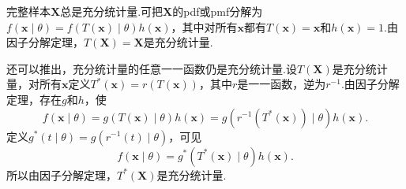 完整样本$\boldsymbol X$总是充分统计量.可把$\boldsymbol X$的pdf或pmf分解为$f(\boldsymbol x\mid\theta)=f(T(\boldsymbol x)\mid\theta)h(\boldsymbol x)$，其中对所有$\boldsymbol x$都有$T(\boldsymbol x)=\boldsymbol x$和$h(\boldsymbol x)=1$.由因子分解定理，$T(\boldsymbol X)=\boldsymbol X$是充分统计量.

还可以推出，充分统计量的任意一一函数仍是充分统计量.设$T(\boldsymbol X)$是充分统计量，对所有$\boldsymbol x$定义$T^*(\boldsymbol x)=r(T(\boldsymbol x))$，其中$r$是一一函数，逆为$r^{-1}$.由因子分解定理，存在$g$和$h$，使
$$f(\boldsymbol x\mid\theta)=g(T(\boldsymbol x)\mid\theta)h(\boldsymbol x)=g(r^{-1}(T^*(\boldsymbol x))\mid\theta)h(\boldsymbol x).$$
定义$g^*(t\mid\theta)=g(r^{-1}(t)\mid\theta)$，可见
$$f(\boldsymbol x\mid\theta)=g^*(T^*(\boldsymbol x)\mid\theta)h(\boldsymbol x).$$
所以由因子分解定理，$T^*(\boldsymbol X)$是充分统计量.

